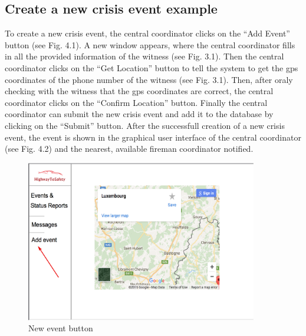 
\subsection{Create a new crisis event example}
To create a new crisis event, the central coordinator clicks on the “Add Event”
button (see Fig. 4.1). A new window appears, where the central coordinator fills
in all the provided information of the witness (see Fig. 3.1). Then the central
coordinator clicks on the “Get Location” button to tell the system to get the gps coordinates of the phone
number of the witness (see Fig. 3.1). Then, after oraly checking with the
witness that the gps coordinates are correct, the central coordinator clicks on
the “Confirm Location” button.
Finally the central coordinator can submit the new crisis event and add it to
the database by clicking on the “Submit” button. After the successfull creation
of a new crisis event, the event is shown in the graphical user interface of the
central coordinator (see Fig. 4.2) and the nearest, available fireman
coordinator notified.
\begin{minipage}{1.0\textwidth}
\begin{figure}[H]
\caption{New event button}
\includegraphics[width=0.9\textwidth]{Add_event.eps}
\end{figure}
\end{minipage}

